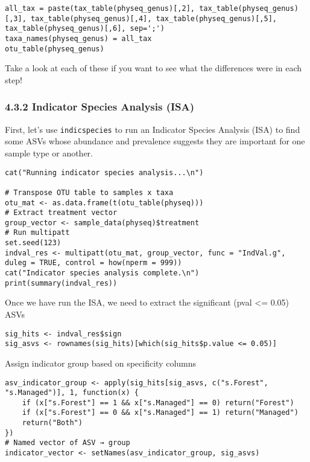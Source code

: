 \documentclass[
]{book}
\begin{document}
\begin{verbatim}
all_tax = paste(tax_table(physeq_genus)[,2], tax_table(physeq_genus)[,3], tax_table(physeq_genus)[,4], tax_table(physeq_genus)[,5], tax_table(physeq_genus)[,6], sep=';')
taxa_names(physeq_genus) = all_tax
otu_table(physeq_genus)
\end{verbatim}

Take a look at each of these if you want to see what the differences were in each step!

\subsubsection{4.3.2 Indicator Species Analysis (ISA)}\label{indicator-species-analysis-isa}

First, let's use \texttt{indicspecies} to run an Indicator Species Analysis (ISA) to find some ASVs whose abundance and prevalence suggests they are important for one sample type or another.

\begin{verbatim}
cat("Running indicator species analysis...\n")

# Transpose OTU table to samples x taxa
otu_mat <- as.data.frame(t(otu_table(physeq)))
# Extract treatment vector
group_vector <- sample_data(physeq)$treatment
# Run multipatt
set.seed(123)
indval_res <- multipatt(otu_mat, group_vector, func = "IndVal.g", duleg = TRUE, control = how(nperm = 999))
cat("Indicator species analysis complete.\n")
print(summary(indval_res))
\end{verbatim}

Once we have run the ISA, we need to extract the significant (pval \textless= 0.05) ASVs

\begin{verbatim}
sig_hits <- indval_res$sign
sig_asvs <- rownames(sig_hits)[which(sig_hits$p.value <= 0.05)]
\end{verbatim}

Assign indicator group based on specificity columns

\begin{verbatim}
asv_indicator_group <- apply(sig_hits[sig_asvs, c("s.Forest", "s.Managed")], 1, function(x) {
    if (x["s.Forest"] == 1 && x["s.Managed"] == 0) return("Forest")
    if (x["s.Forest"] == 0 && x["s.Managed"] == 1) return("Managed")
    return("Both")
})
# Named vector of ASV → group
indicator_vector <- setNames(asv_indicator_group, sig_asvs)
\end{verbatim}
\end{document}
